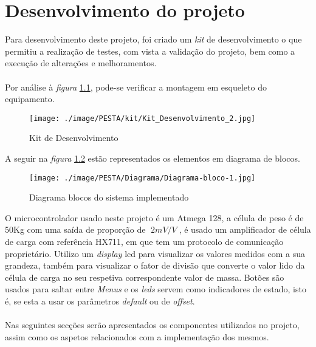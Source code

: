 \chapter{Desenvolvimento do projeto}
Para desenvolvimento deste projeto, foi criado um \textit{kit} de desenvolvimento o que permitiu a realização de testes, com vista a validação do projeto, bem como a execução de alterações e melhoramentos.
\\
\\
Por análise à \textit{figura} \ref{Kit_Desenvolvimento_2}, pode-se verificar a montagem em esqueleto do equipamento.
\\
\begin{figure}[H]
	\centering
	\texttt{[image: ./image/PESTA/kit/Kit\_Desenvolvimento\_2.jpg]}
	\caption{Kit de Desenvolvimento}
	\label{Kit_Desenvolvimento_2}
\end{figure}
A seguir na \textit{figura} \ref{Diagrama-bloco-1} estão representados os elementos em diagrama de blocos.
\begin{figure}[H]
	\centering
	\texttt{[image: ./image/PESTA/Diagrama/Diagrama-bloco-1.jpg]}
	\caption{Diagrama blocos do sistema implementado}
	\label{Diagrama-bloco-1}
\end{figure}
O microcontrolador usado neste projeto é um Atmega 128, a célula de peso é de 50Kg com uma saída de proporção de $\; 2mV/V \;$, é usado um amplificador de célula de carga com referência HX711, em que tem um protocolo de comunicação proprietário.
Utilizo um \textit{display} \acs{lcd} para visualizar os valores medidos com a sua grandeza, também para visualizar o fator de divisão que converte o valor lido da célula de carga no seu respetiva correspondente valor de massa.
Botões são usados para saltar entre \textit{Menus} e os \textit{leds} servem como indicadores de estado, isto é, se esta a usar os parâmetros \textit{default} ou de \textit{offset}.
\\
\\
Nas seguintes secções serão apresentados os componentes utilizados no projeto, assim como os aspetos relacionados com a implementação dos mesmos.
